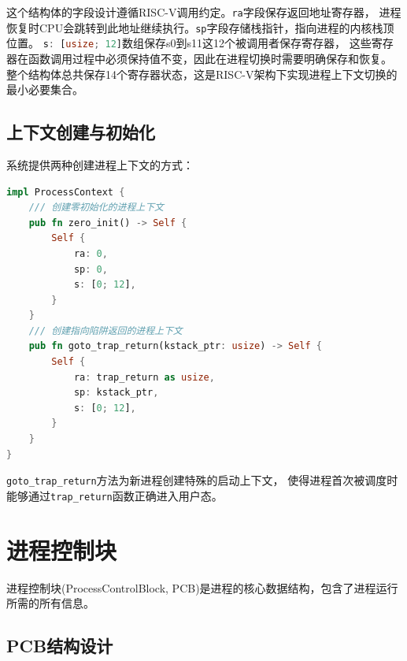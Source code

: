 这个结构体的字段设计遵循RISC-V调用约定。\lstinline[language=Rust]{ra}字段保存返回地址寄存器，
进程恢复时CPU会跳转到此地址继续执行。\lstinline[language=Rust]{sp}字段存储栈指针，指向进程的内核栈顶位置。
\lstinline[language=Rust]{s: [usize; 12]}数组保存s0到s11这12个被调用者保存寄存器，
这些寄存器在函数调用过程中必须保持值不变，因此在进程切换时需要明确保存和恢复。
整个结构体总共保存14个寄存器状态，这是RISC-V架构下实现进程上下文切换的最小必要集合。

\subsection{上下文创建与初始化}

系统提供两种创建进程上下文的方式：

\begin{lstlisting}[language=Rust,caption={上下文创建方法}, label={lst:context-creation}]
impl ProcessContext {
    /// 创建零初始化的进程上下文
    pub fn zero_init() -> Self {
        Self {
            ra: 0,
            sp: 0,
            s: [0; 12],
        }
    }
    /// 创建指向陷阱返回的进程上下文
    pub fn goto_trap_return(kstack_ptr: usize) -> Self {
        Self {
            ra: trap_return as usize,
            sp: kstack_ptr,
            s: [0; 12],
        }
    }
}
\end{lstlisting}

\lstinline[language=Rust]{goto_trap_return}方法为新进程创建特殊的启动上下文，
使得进程首次被调度时能够通过\lstinline[language=Rust]{trap_return}函数正确进入用户态。

\section{进程控制块}

进程控制块(ProcessControlBlock, PCB)是进程的核心数据结构，包含了进程运行所需的所有信息。

\subsection{PCB结构设计}

